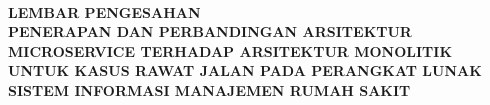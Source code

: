 \renewcommand{\headrulewidth}{3pt} 
\thispagestyle{fancy}

\hspace{-2cm}\\[1cm]
\begin{center}
{\bfseries LEMBAR PENGESAHAN}\\[1.0 cm]
{\bfseries PENERAPAN DAN PERBANDINGAN ARSITEKTUR MICROSERVICE TERHADAP ARSITEKTUR MONOLITIK UNTUK KASUS RAWAT JALAN PADA PERANGKAT LUNAK SISTEM INFORMASI MANAJEMEN RUMAH SAKIT} \\[0.5 cm]
\end{center}

\vspace{0.5cm}


